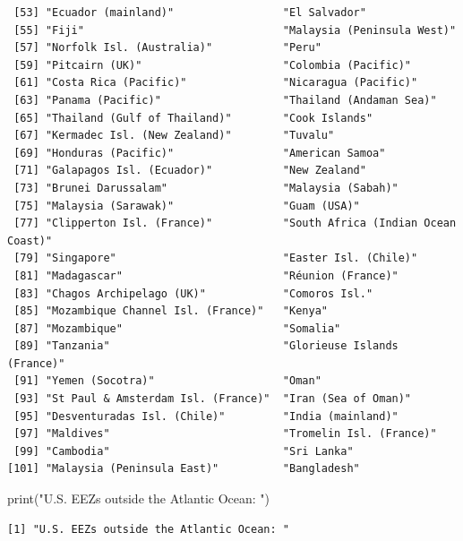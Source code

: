 \documentclass[
  letterpaper,
  oneside,
  open=any]{scrbook}
\newenvironment{Shaded}{\begin{snugshade}}{\end{snugshade}}
\newcommand{\FunctionTok}[1]{\textcolor[rgb]{0.28,0.35,0.67}{#1}}
\newcommand{\NormalTok}[1]{\textcolor[rgb]{0.00,0.23,0.31}{#1}}
\newcommand{\StringTok}[1]{\textcolor[rgb]{0.13,0.47,0.30}{#1}}
\begin{document}
\begin{verbatim}
 [53] "Ecuador (mainland)"                 "El Salvador"                       
 [55] "Fiji"                               "Malaysia (Peninsula West)"         
 [57] "Norfolk Isl. (Australia)"           "Peru"                              
 [59] "Pitcairn (UK)"                      "Colombia (Pacific)"                
 [61] "Costa Rica (Pacific)"               "Nicaragua (Pacific)"               
 [63] "Panama (Pacific)"                   "Thailand (Andaman Sea)"            
 [65] "Thailand (Gulf of Thailand)"        "Cook Islands"                      
 [67] "Kermadec Isl. (New Zealand)"        "Tuvalu"                            
 [69] "Honduras (Pacific)"                 "American Samoa"                    
 [71] "Galapagos Isl. (Ecuador)"           "New Zealand"                       
 [73] "Brunei Darussalam"                  "Malaysia (Sabah)"                  
 [75] "Malaysia (Sarawak)"                 "Guam (USA)"                        
 [77] "Clipperton Isl. (France)"           "South Africa (Indian Ocean Coast)" 
 [79] "Singapore"                          "Easter Isl. (Chile)"               
 [81] "Madagascar"                         "Réunion (France)"                  
 [83] "Chagos Archipelago (UK)"            "Comoros Isl."                      
 [85] "Mozambique Channel Isl. (France)"   "Kenya"                             
 [87] "Mozambique"                         "Somalia"                           
 [89] "Tanzania"                           "Glorieuse Islands (France)"        
 [91] "Yemen (Socotra)"                    "Oman"                              
 [93] "St Paul & Amsterdam Isl. (France)"  "Iran (Sea of Oman)"                
 [95] "Desventuradas Isl. (Chile)"         "India (mainland)"                  
 [97] "Maldives"                           "Tromelin Isl. (France)"            
 [99] "Cambodia"                           "Sri Lanka"                         
[101] "Malaysia (Peninsula East)"          "Bangladesh"                        
\end{verbatim}

\begin{Shaded}
\begin{Highlighting}[]
\FunctionTok{print}\NormalTok{(}\StringTok{"U.S. EEZs outside the Atlantic Ocean: "}\NormalTok{)}
\end{Highlighting}
\end{Shaded}

\begin{verbatim}
[1] "U.S. EEZs outside the Atlantic Ocean: "
\end{verbatim}
\end{document}
